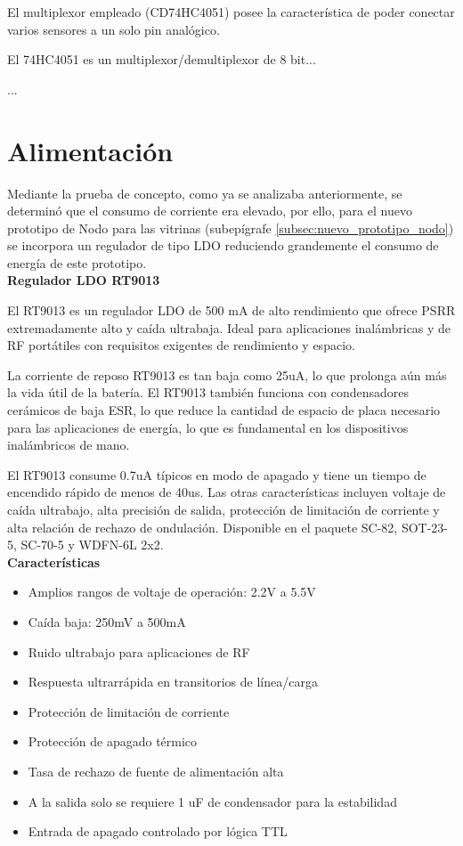 El multiplexor empleado (CD74HC4051) posee la característica de poder conectar varios sensores a un solo pin analógico.

El 74HC4051 es un multiplexor/demultiplexor de 8 bit...

...



\section{Alimentación}

Mediante la prueba de concepto, como ya se analizaba anteriormente, se determinó que el consumo de corriente era elevado, por ello, para el nuevo prototipo de Nodo para las vitrinas (subepígrafe \ref{subsec:nuevo_prototipo_nodo}) se 
incorpora un regulador de tipo LDO reduciendo grandemente el consumo de energía de este prototipo.\\

\textbf{Regulador LDO RT9013}

El RT9013 es un regulador LDO de 500 mA de alto rendimiento que ofrece PSRR extremadamente alto y caída ultrabaja. Ideal para aplicaciones inalámbricas y de RF portátiles con requisitos exigentes de rendimiento y espacio.

La corriente de reposo RT9013 es tan baja como 25uA, lo que prolonga aún más la vida útil de la batería. El RT9013 también funciona con condensadores cerámicos de baja ESR, lo que reduce la cantidad de espacio de placa necesario para las aplicaciones de energía, lo que es fundamental en los dispositivos inalámbricos de mano.

El RT9013 consume 0.7uA típicos en modo de apagado y tiene un tiempo de encendido rápido de menos de 40us. Las otras características incluyen voltaje de caída ultrabajo, alta precisión de salida, protección de limitación de corriente y alta relación de rechazo de ondulación. Disponible en el paquete SC-82, SOT-23-5, SC-70-5 y WDFN-6L 2x2.\\

\textbf{Características}

\begin{itemize}
    \item Amplios rangos de voltaje de operación: 2.2V a 5.5V
    \item Caída baja: 250mV a 500mA
    \item Ruido ultrabajo para aplicaciones de RF
    \item Respuesta ultrarrápida en transitorios de línea/carga
    \item Protección de limitación de corriente
    \item Protección de apagado térmico
    \item Tasa de rechazo de fuente de alimentación alta
    \item A la salida solo se requiere 1 uF de condensador para la estabilidad
    \item Entrada de apagado controlado por lógica TTL
\end{itemize}

